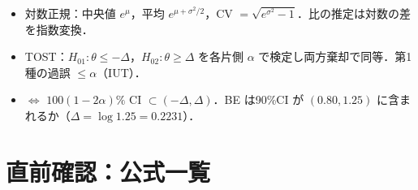 \documentclass[a4paper,11pt,openany]{ltjsbook}
\begin{document}
\begin{summarybox}
\begin{itemize}
\item 対数正規：中央値 $e^\mu$，平均 $e^{\mu+\sigma^2/2}$，CV $=\sqrt{e^{\sigma^2}-1}$．比の推定は対数の差を指数変換．
\item TOST：$H_{01}:\theta\le-\Delta$，$H_{02}:\theta\ge\Delta$ を各片側 $\alpha$ で検定し両方棄却で同等．第1種の過誤 $\le\alpha$（IUT）．
\item $\iff$ $100(1-2\alpha)\%$ CI $\subset(-\Delta,\Delta)$．BE は90\%CI が $(0.80,1.25)$ に含まれるか（$\Delta=\log1.25=0.2231$）．
\end{itemize}
\end{summarybox}

\backmatter
\chapter*{直前確認：公式一覧}
\end{document}
